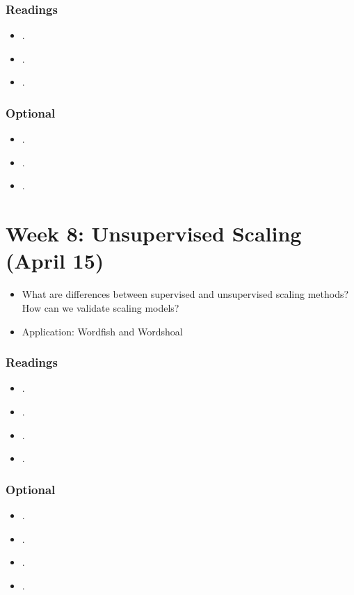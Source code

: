 \documentclass[abstract=on,parskip=full,headings=standardclasses,fontsize=11pt,paper=a4]{scrartcl}
\begin{document}
\subsubsection*{Readings}
\begin{itemize}
\item {}.
\item {}.
\item {}.
\end{itemize}

\subsubsection*{Optional}
\begin{itemize}
\item {}.
\item {}.
\item {}.
\end{itemize}


\section{Week 8: Unsupervised Scaling (April 15)}

\begin{itemize}
\item What are differences between supervised and unsupervised scaling methods? How can we validate scaling models?
\item Application: Wordfish and Wordshoal
\end{itemize}

\subsubsection*{Readings}
\begin{itemize}
\item {}.
\item {}.
\item {}.
\item {}.
\end{itemize}

\subsubsection*{Optional}
\begin{itemize}
\item {}.
\item {}.
\item {}.
\item {}.
\end{itemize}
\end{document}
